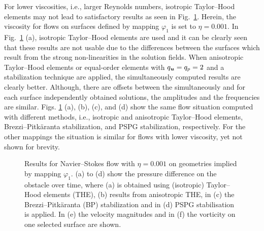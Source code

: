 \documentclass[12pt, twoside, english]{article}
\numberwithin{equation}{section}
\newcommand{\vek}[1]{\mathchoice{\displaystyle\boldsymbol#1}
{\textstyle\boldsymbol#1}{\scriptstyle\boldsymbol#1}
{\scriptscriptstyle\boldsymbol#1}}
\begin{document}
For lower viscosities, i.e., larger Reynolds numbers, isotropic Taylor--Hood elements may not lead to satisfactory results as seen in Fig.~\ref{fig:TurekInstatNSEQ-ResPD-001}. Herein, the viscosity for flows on surfaces defined by mapping $\varphi_1$ is set to $\eta = 0.001$. In Fig.~\ref{fig:TurekInstatNSEQ-ResPD-001} (a), isotropic Taylor--Hood elements are used and it can be clearly seen that these results are not usable due to the differences between the surfaces which result from the strong non-linearities in the solution fields. When anisotropic  Taylor--Hood elements or equal-order elements with $q_{\vek{u}} = q_{p} = 2$ and a stabilization technique are applied, the simultaneously computed results are clearly better. Although, there are offsets between the simultaneously and for each surface independently obtained solutions, the amplitudes and the frequencies are similar. Figs. \ref{fig:TurekInstatNSEQ-ResPD-001} (a), (b), (c), and (d) show the same flow situation computed with different methods, i.e., isotropic and anisotropic Taylor--Hood elements, Brezzi--Pitkäranta stabilization, and PSPG stabilization, respectively. For the other mappings the situation is similar for flows with lower viscosity, yet not shown for brevity.
\begin{figure}
	\centering
	
	\hspace{0.1\textwidth}
	\hspace{0.1\textwidth}
	\subfigure[$\varphi_2$ - anisotropic THE - $\lVert \vek{u} \rVert$, $t = 3$]{\texttt{[image: Turek-instat\_mu0001\_3\_600\_uvwMagn\_BTF]}}\hspace{0.1\textwidth}
	
	\caption{\label{fig:TurekInstatNSEQ-ResPD-001} Results for Navier--Stokes flow with $\eta = 0.001$ on geometries implied by mapping $\varphi_1$. (a) to (d) show the pressure difference on the obstacle over time, where (a) is obtained using (isotropic) Taylor--Hood elements (THE), (b) results from anisotropic THE, in (c) the Brezzi--Pitkäranta (BP) stabilization and in (d) PSPG stabilisation is applied. In (e) the velocity magnitudes and in (f) the vorticity on one selected surface are shown.}
\end{figure}
\end{document}
